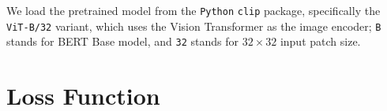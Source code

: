 We load the pretrained model from the \texttt{Python} \texttt{clip} package, specifically the \texttt{ViT-B/32} variant, which uses the Vision Transformer \citep{visiontransformer} as the image encoder; \texttt{B} stands for BERT Base model, and \texttt{32} stands for $32 \times 32$ input patch size. 

\section{Loss Function}


